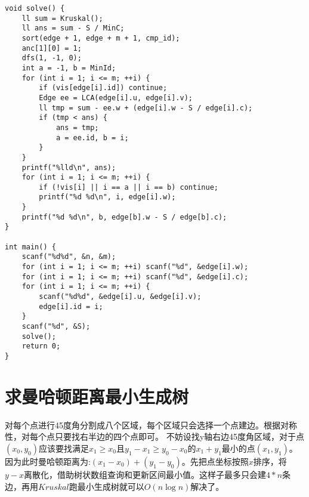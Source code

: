 \begin{lstlisting}
void solve() {
    ll sum = Kruskal();
    ll ans = sum - S / MinC;
    sort(edge + 1, edge + m + 1, cmp_id);
    anc[1][0] = 1;
    dfs(1, -1, 0);
    int a = -1, b = MinId;
    for (int i = 1; i <= m; ++i) {
        if (vis[edge[i].id]) continue;
        Edge ee = LCA(edge[i].u, edge[i].v);
        ll tmp = sum - ee.w + (edge[i].w - S / edge[i].c);
        if (tmp < ans) {
            ans = tmp;
            a = ee.id, b = i;
        }
    }
    printf("%lld\n", ans);
    for (int i = 1; i <= m; ++i) {
        if (!vis[i] || i == a || i == b) continue;
        printf("%d %d\n", i, edge[i].w);
    }
    printf("%d %d\n", b, edge[b].w - S / edge[b].c);
}

int main() {
    scanf("%d%d", &n, &m);
    for (int i = 1; i <= m; ++i) scanf("%d", &edge[i].w);
    for (int i = 1; i <= m; ++i) scanf("%d", &edge[i].c);
    for (int i = 1; i <= m; ++i) {
        scanf("%d%d", &edge[i].u, &edge[i].v);
        edge[i].id = i;
    }
    scanf("%d", &S);
    solve();
    return 0;
}
\end{lstlisting}
\section{求曼哈顿距离最小生成树}

对每个点进行45度角分割成八个区域，每个区域只会选择一个点建边。根据对称性，对每个点只要找右半边的四个点即可。
不妨设找y轴右边45度角区域，对于点$(x_0,y_0)$应该要找满足$x_1 \geq x_0$且$y_1 - x_1 \geq y_0 - x_0$的$x_1 + y_1$最小的点$(x_1,y_1)$。 \\

因为此时曼哈顿距离为:$(x_1 - x_0)+(y_1-y_0)$。先把点坐标按照$x$排序，将$y-x$离散化，借助树状数组查询和更新区间最小值。这样子最多只会建$4*n$条边，再用$Kruskal$跑最小生成树就可以$O(n\log n)$解决了。

